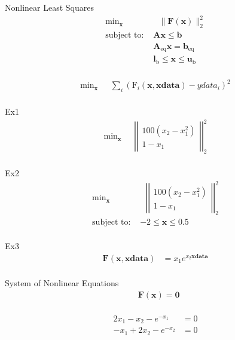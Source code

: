 \documentclass{article}
\begin{document}
Nonlinear Least Squares
\begin{align*}
    \text{min}_{\mathbf{x}}& \text{ } \| \mathbf{F} \left(\mathbf{x}\right) \|_2^2\\
    \mbox{subject to: }& \mathbf{A}\mathbf{x} \le \mathbf{b}\\
                       & \mathbf{A}_{\text{eq}}\mathbf{x} = \mathbf{b}_{\text{eq}}\\
                       & \mathbf{l}_{\text{b}} \le \mathbf{x} \le \mathbf{u}_{\text{b}}\\
\end{align*}

\begin{align*}
\text{min}_{\mathbf{x}}& \text{ } \sum_i \left( \text{F}_i \left( \mathbf{x}, \mathbf{xdata} \right) - ydata_i \right)^2\\
\end{align*}

Ex1
\begin{align*}
\text{min}_{\mathbf{x}}& \text{ } \left|\left| \begin{matrix} 100\left(x_2-x_1^2\right) \\1-x_1 \end{matrix}  \right|\right|_2^2\\
\end{align*}

Ex2
\begin{align*}
\text{min}_{\mathbf{x}}& \text{ } \left|\left| \begin{matrix} 100\left(x_2-x_1^2\right) \\1-x_1 \end{matrix}  \right|\right|_2^2\\
\mbox{subject to: }& -2 \le \mathbf{x} \le 0.5\\
\end{align*}

Ex3
\begin{align*}
\mathbf{F} \left(\mathbf{x},\mathbf{xdata}\right) &= x_1 e^{x_2 \mathbf{xdata}}\\
\end{align*}

System of Nonlinear Equations
\begin{align*}
     & \mathbf{F} \left( \mathbf{x} \right) = \mathbf{0} \\
\end{align*}

\begin{align*}
    2x_1 - x_2 - e^{-x_1} &= 0\\
    -x_1 + 2x_2 - e^{-x_2} &= 0\\
\end{align*}
\end{document}
